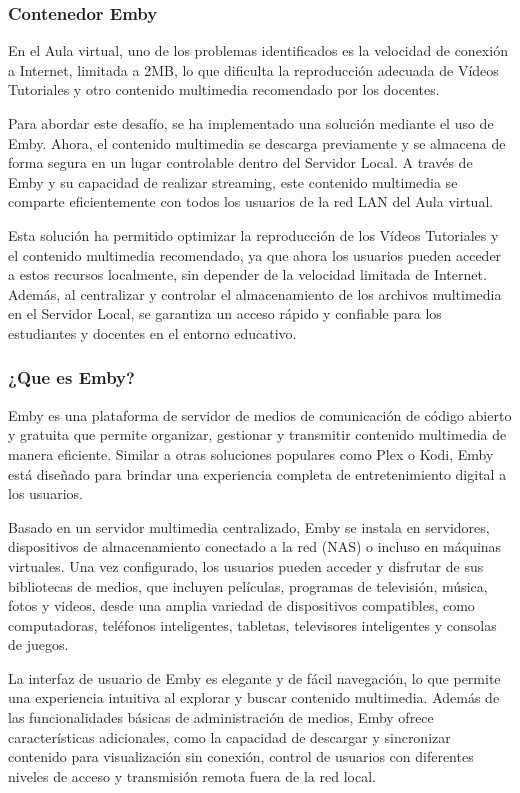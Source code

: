 		\subsubsection{Contenedor Emby}
		
		
		En el Aula virtual, uno de los problemas identificados es la velocidad de conexión a Internet, limitada a 2MB, lo que dificulta la reproducción adecuada de Vídeos Tutoriales y otro contenido multimedia recomendado por los docentes.
		
		Para abordar este desafío, se ha implementado una solución mediante el uso de Emby. Ahora, el contenido multimedia se 	descarga previamente y se almacena de forma segura en un lugar controlable dentro del Servidor Local. A través de Emby y su capacidad de realizar streaming, este contenido multimedia se comparte eficientemente con todos los usuarios de la red LAN del Aula virtual.
		
		Esta solución ha permitido optimizar la reproducción de los Vídeos Tutoriales y el contenido multimedia recomendado, ya que ahora los usuarios pueden acceder a estos recursos localmente, sin depender de la velocidad limitada de Internet. Además, al centralizar y controlar el almacenamiento de los archivos multimedia en el Servidor Local, se garantiza un acceso rápido y confiable para los estudiantes y docentes en el entorno educativo.
		
		\subsubsection{¿Que es Emby?}
		
		Emby es una plataforma de servidor de medios de comunicación de código abierto y gratuita que permite organizar, gestionar y transmitir contenido multimedia de manera eficiente. Similar a otras soluciones populares como Plex o Kodi, Emby está diseñado para brindar una experiencia completa de entretenimiento digital a los usuarios.
		
		Basado en un servidor multimedia centralizado, Emby se instala en servidores, dispositivos de almacenamiento conectado a la red (NAS) o incluso en máquinas virtuales. Una vez configurado, los usuarios pueden acceder y disfrutar de sus bibliotecas de medios, que incluyen películas, programas de televisión, música, fotos y videos, desde una amplia variedad de dispositivos compatibles, como computadoras, teléfonos inteligentes, tabletas, televisores inteligentes y consolas de juegos.
		
		La interfaz de usuario de Emby es elegante y de fácil navegación, lo que permite una experiencia intuitiva al explorar y buscar contenido multimedia. Además de las funcionalidades básicas de administración de medios, Emby ofrece características adicionales, como la capacidad de descargar y sincronizar contenido para visualización sin conexión, control de usuarios con diferentes niveles de acceso y transmisión remota fuera de la red local. 
		
